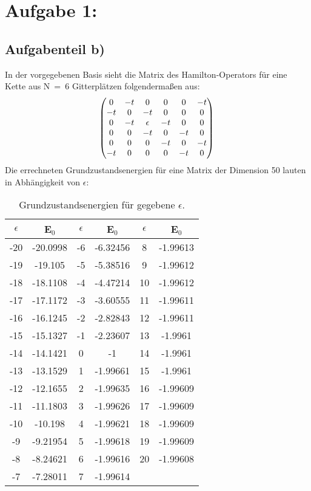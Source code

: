 \section*{Aufgabe 1: }

\subsection*{Aufgabenteil b)}
In der vorgegebenen Basis sieht die Matrix des Hamilton-Operators
für eine Kette aus N~=~6 Gitterplätzen folgendermaßen aus:
\begin{equation}
  \begin{pmatrix}
    0 & -t & 0 & 0 & 0 & -t \\
    -t & 0 & -t & 0 & 0 & 0 \\
    0 & -t & \epsilon & -t & 0 & 0 \\
    0 & 0 & -t & 0 & -t & 0 \\
    0 & 0 & 0 & -t & 0 & -t \\
    -t & 0 & 0 & 0 & -t & 0 \\
  \end{pmatrix} \\
\end{equation}
Die errechneten Grundzustandsenergien für eine Matrix der Dimension 50 lauten in Abhängigkeit von $\epsilon$:
\begin{table}[H]
  \centering
  \caption{Grundzustandsenergien für gegebene $\epsilon$.}
  \label{tab:tab1}
    \begin{tabular}{c c|c c|c c}
    \toprule
    $ \epsilon $ & E$_0$ &$ \epsilon $ & E$_0$&  $\epsilon $ & E$_0$\\
    \midrule
    -20 & -20.0998 & -6 & -6.32456 & 8 & -1.99613\\
    -19 & -19.105 & -5 & -5.38516 & 9 & -1.99612\\
    -18 & -18.1108 & -4 & -4.47214 & 10 & -1.99612\\
    -17 & -17.1172 & -3 & -3.60555 & 11 & -1.99611\\
    -16 & -16.1245 & -2 & -2.82843 & 12 & -1.99611\\
    -15 & -15.1327 & -1 & -2.23607 & 13 & -1.9961\\
    -14 & -14.1421 & 0 & -1 & 14 & -1.9961\\
    -13 & -13.1529 & 1 & -1.99661 & 15 & -1.9961\\
    -12 & -12.1655 & 2 & -1.99635 & 16 & -1.99609\\
    -11 & -11.1803 & 3 & -1.99626 & 17 & -1.99609\\
    -10 & -10.198 & 4 & -1.99621 & 18 & -1.99609\\
    -9 & -9.21954 & 5 & -1.99618 & 19 & -1.99609\\
    -8 & -8.24621 & 6 & -1.99616 & 20 & -1.99608\\
    -7 & -7.28011 & 7 & -1.99614 &  & \\
      \bottomrule
    \end{tabular}
\end{table}

